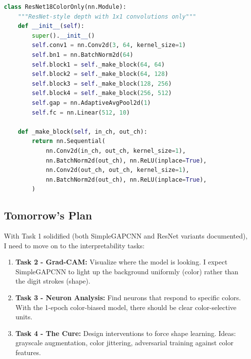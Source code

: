 \documentclass[9pt,a4paper,twocolumn,twoside]{tau-class/tau}
\begin{document}
        \begin{code}
            \begin{lstlisting}[language=python]
class ResNet18ColorOnly(nn.Module):
    """ResNet-style depth with 1x1 convolutions only"""
    def __init__(self):
        super().__init__()
        self.conv1 = nn.Conv2d(3, 64, kernel_size=1)
        self.bn1 = nn.BatchNorm2d(64)
        self.block1 = self._make_block(64, 64)
        self.block2 = self._make_block(64, 128)
        self.block3 = self._make_block(128, 256)
        self.block4 = self._make_block(256, 512)
        self.gap = nn.AdaptiveAvgPool2d(1)
        self.fc = nn.Linear(512, 10)

    def _make_block(self, in_ch, out_ch):
        return nn.Sequential(
            nn.Conv2d(in_ch, out_ch, kernel_size=1),
            nn.BatchNorm2d(out_ch), nn.ReLU(inplace=True),
            nn.Conv2d(out_ch, out_ch, kernel_size=1),
            nn.BatchNorm2d(out_ch), nn.ReLU(inplace=True),
        )
            \end{lstlisting}
            \caption{ResNet-style architecture with 1$\times$1 kernels (no spatial learning)}
            \label{lst:resnetcoloronly}
        \end{code}

    \subsection{Tomorrow's Plan}

        With Task 1 solidified (both SimpleGAPCNN and ResNet variants documented), I need to move on to the interpretability tasks:

        \begin{enumerate}
            \item \textbf{Task 2 - Grad-CAM:} Visualize where the model is looking. I expect SimpleGAPCNN to light up the background uniformly (color) rather than the digit strokes (shape).

            \item \textbf{Task 3 - Neuron Analysis:} Find neurons that respond to specific colors. With the 1-epoch color-biased model, there should be clear color-selective units.

            \item \textbf{Task 4 - The Cure:} Design interventions to force shape learning. Ideas: grayscale augmentation, color jittering, adversarial training against color features.
        \end{enumerate}
\end{document}
